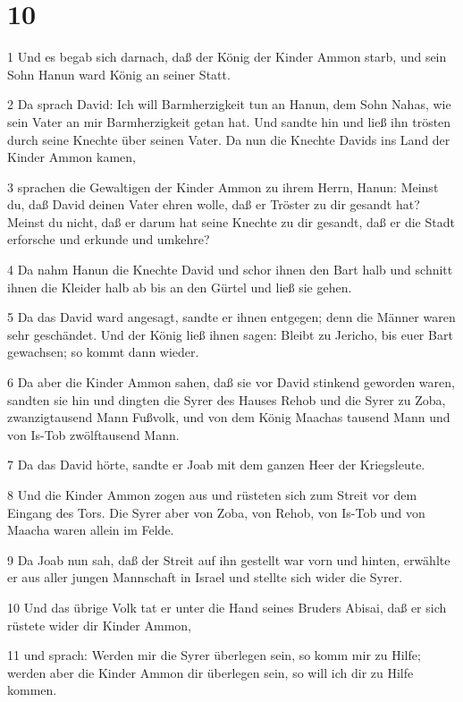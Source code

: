 \chapter{10}

\par 1 Und es begab sich darnach, daß der König der Kinder Ammon starb, und sein Sohn Hanun ward König an seiner Statt.
\par 2 Da sprach David: Ich will Barmherzigkeit tun an Hanun, dem Sohn Nahas, wie sein Vater an mir Barmherzigkeit getan hat. Und sandte hin und ließ ihn trösten durch seine Knechte über seinen Vater. Da nun die Knechte Davids ins Land der Kinder Ammon kamen,
\par 3 sprachen die Gewaltigen der Kinder Ammon zu ihrem Herrn, Hanun: Meinst du, daß David deinen Vater ehren wolle, daß er Tröster zu dir gesandt hat? Meinst du nicht, daß er darum hat seine Knechte zu dir gesandt, daß er die Stadt erforsche und erkunde und umkehre?
\par 4 Da nahm Hanun die Knechte David und schor ihnen den Bart halb und schnitt ihnen die Kleider halb ab bis an den Gürtel und ließ sie gehen.
\par 5 Da das David ward angesagt, sandte er ihnen entgegen; denn die Männer waren sehr geschändet. Und der König ließ ihnen sagen: Bleibt zu Jericho, bis euer Bart gewachsen; so kommt dann wieder.
\par 6 Da aber die Kinder Ammon sahen, daß sie vor David stinkend geworden waren, sandten sie hin und dingten die Syrer des Hauses Rehob und die Syrer zu Zoba, zwanzigtausend Mann Fußvolk, und von dem König Maachas tausend Mann und von Is-Tob zwölftausend Mann.
\par 7 Da das David hörte, sandte er Joab mit dem ganzen Heer der Kriegsleute.
\par 8 Und die Kinder Ammon zogen aus und rüsteten sich zum Streit vor dem Eingang des Tors. Die Syrer aber von Zoba, von Rehob, von Is-Tob und von Maacha waren allein im Felde.
\par 9 Da Joab nun sah, daß der Streit auf ihn gestellt war vorn und hinten, erwählte er aus aller jungen Mannschaft in Israel und stellte sich wider die Syrer.
\par 10 Und das übrige Volk tat er unter die Hand seines Bruders Abisai, daß er sich rüstete wider dir Kinder Ammon,
\par 11 und sprach: Werden mir die Syrer überlegen sein, so komm mir zu Hilfe; werden aber die Kinder Ammon dir überlegen sein, so will ich dir zu Hilfe kommen.
